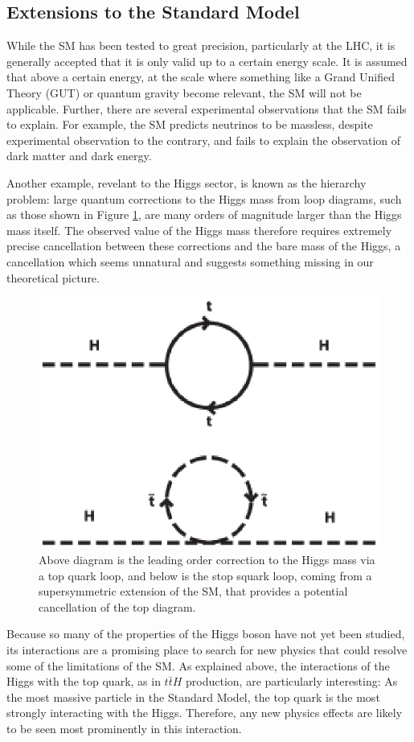 
\subsection{Extensions to the Standard Model}
\label{sec:bsm}

While the SM has been tested to great precision, particularly at the LHC, it is generally accepted that it is only valid up to a certain energy scale. It is assumed that above a certain energy, at the scale where something like a Grand Unified Theory (GUT) or quantum gravity become relevant, the SM will not be applicable. Further, there are several experimental observations that the SM fails to explain. For example, the SM predicts neutrinos to be massless, despite experimental observation to the contrary, and fails to explain the observation of dark matter and dark energy. 

Another example, revelant to the Higgs sector, is known as the hierarchy problem: large quantum corrections to the Higgs mass from loop diagrams, such as those shown in Figure \ref{fig:hierarchyDiagram}, are many orders of magnitude larger than the Higgs mass itself. The observed value of the Higgs mass therefore requires extremely precise cancellation between these corrections and the bare mass of the Higgs, a cancellation which seems unnatural and suggests something missing in our theoretical picture.

\begin{figure}[H]
\centering
   \includegraphics[width=0.5\linewidth]{figures/theory/hierarchyDiagram.eps}
\caption{Above diagram is the leading order correction to the Higgs mass via a top quark loop, and below is the stop squark loop, coming from a supersymmetric extension of the SM, that provides a potential cancellation of the top diagram.}
\label{fig:hierarchyDiagram}
\end{figure}

Because so many of the properties of the Higgs boson have not yet been studied, its interactions are a promising place to search for new physics that could resolve some of the limitations of the SM. As explained above, the interactions of the Higgs with the top quark, as in $t\bar{t}H$ production, are particularly interesting: As the most massive particle in the Standard Model, the top quark is the most strongly interacting with the Higgs. Therefore, any new physics effects are likely to be seen most prominently in this interaction.

